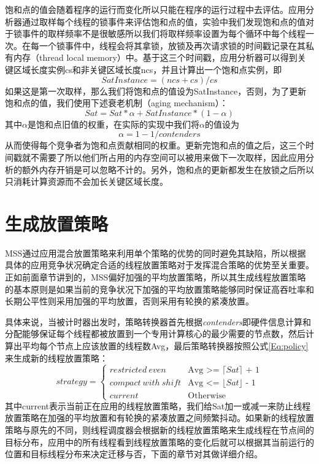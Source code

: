 饱和点的值会随着程序的运行而变化所以只能在程序的运行过程中去评估。应用分析器通过取样每个线程的锁事件来评估饱和点的值，实验中我们发现饱和点的值对于锁事件的取样频率不是很敏感所以我们将取样频率设置为每个循环中每个线程一次。在每一个锁事件中，线程会将其拿锁，放锁及再次请求锁的时间戳记录在其私有内存（thread local memory）中。基于这三个时间戳，应用分析器可以得到关键区域长度实例cs和非关键区域长度ncs，并且计算出一个饱和点实例，即
\begin{equation}\label{Eq:saturationInstance}
     SatInstance = (ncs + cs) / cs
\end{equation}
如果这是第一次取样，那么我们将饱和点的值设为SatInstance，否则，为了更新饱和点的值，我们使用下述衰老机制（aging mechanism）：
\begin{equation}
     Sat = Sat * \alpha + SatInstance * (1 - \alpha)
\end{equation}
其中$\alpha$是饱和点旧值的权重，在实际的实现中我们将$\alpha$的值设为
\begin{equation}
     \alpha = 1 - 1/contenders
\end{equation} 
从而使得每个竞争者为饱和点贡献相同的权重。更新完饱和点的值之后，这三个时间戳就不需要了所以他们所占用的内存空间可以被用来做下一次取样，因此应用分析的额外内存开销是可以忽略不计的。另外，饱和点的更新都发生在放锁之后所以只消耗计算资源而不会加长关键区域长度。

\section{生成放置策略}
MSS通过应用混合放置策略来利用单个策略的优势的同时避免其缺陷，所以根据具体的应用竞争状况确定合适的线程放置策略对于发挥混合策略的优势至关重要。正如前面章节讲到的，MSS偏好加强的平均放置策略，所以其生成线程放置策略的基本原则是如果当前的竞争状况下加强的平均放置策略能够同时保证高吞吐率和长期公平性则采用加强的平均放置，否则采用有轮换的紧凑放置。

具体来说，当被计时器出发时，策略转换器首先根据\emph{contenders}即硬件信息计算和分配能够保证每个线程都被放置到一个专用计算核心的最少需要的节点数，然后计算出平均每个节点上应该放置的线程数Avg，最后策略转换器按照公式\ref{Eq:policy}来生成新的线程放置策略：
\begin{equation}\label{Eq:policy}
strategy=
\begin{cases}
restricted\ even &\text{Avg >= $\lceil Sat \rceil$ + 1}\\
compact\ with\ shift &\text{Avg <= $\lfloor Sat \rfloor$ - 1}\\
current &\text{Otherwise}
\end{cases}
\end{equation}
其中current表示当前正在应用的线程放置策略，我们给Sat加一或减一来防止线程放置策略在加强的平均放置和有轮换的紧凑放置之间频繁抖动。如果新的线程放置策略与原先的不同，则线程调度器会根据新的线程放置策略来生成线程在节点间的目标分布，应用中的所有线程看到线程放置策略的变化后就可以根据其当前运行的位置和目标线程分布来决定迁移与否，下面的章节对其做详细介绍。

